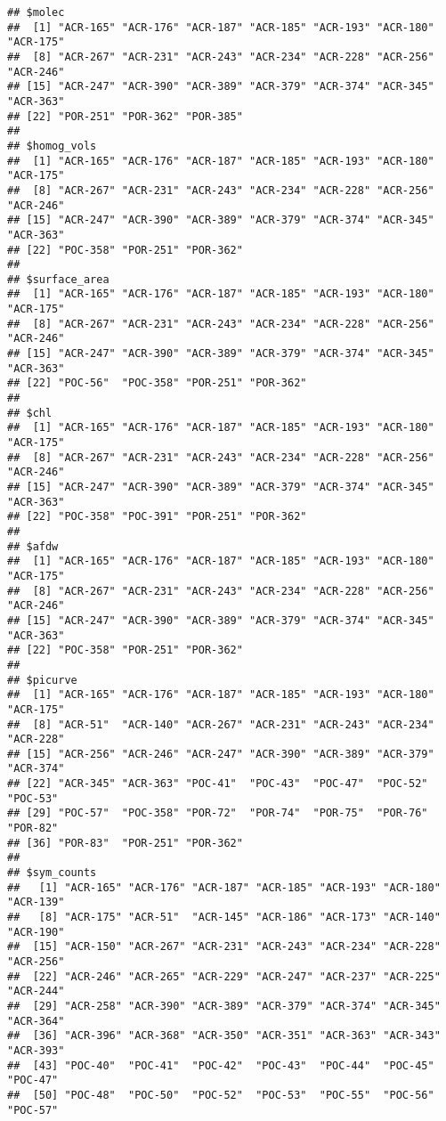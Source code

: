 \documentclass[]{article}
\begin{document}
\begin{verbatim}
## $molec
##  [1] "ACR-165" "ACR-176" "ACR-187" "ACR-185" "ACR-193" "ACR-180" "ACR-175"
##  [8] "ACR-267" "ACR-231" "ACR-243" "ACR-234" "ACR-228" "ACR-256" "ACR-246"
## [15] "ACR-247" "ACR-390" "ACR-389" "ACR-379" "ACR-374" "ACR-345" "ACR-363"
## [22] "POR-251" "POR-362" "POR-385"
## 
## $homog_vols
##  [1] "ACR-165" "ACR-176" "ACR-187" "ACR-185" "ACR-193" "ACR-180" "ACR-175"
##  [8] "ACR-267" "ACR-231" "ACR-243" "ACR-234" "ACR-228" "ACR-256" "ACR-246"
## [15] "ACR-247" "ACR-390" "ACR-389" "ACR-379" "ACR-374" "ACR-345" "ACR-363"
## [22] "POC-358" "POR-251" "POR-362"
## 
## $surface_area
##  [1] "ACR-165" "ACR-176" "ACR-187" "ACR-185" "ACR-193" "ACR-180" "ACR-175"
##  [8] "ACR-267" "ACR-231" "ACR-243" "ACR-234" "ACR-228" "ACR-256" "ACR-246"
## [15] "ACR-247" "ACR-390" "ACR-389" "ACR-379" "ACR-374" "ACR-345" "ACR-363"
## [22] "POC-56"  "POC-358" "POR-251" "POR-362"
## 
## $chl
##  [1] "ACR-165" "ACR-176" "ACR-187" "ACR-185" "ACR-193" "ACR-180" "ACR-175"
##  [8] "ACR-267" "ACR-231" "ACR-243" "ACR-234" "ACR-228" "ACR-256" "ACR-246"
## [15] "ACR-247" "ACR-390" "ACR-389" "ACR-379" "ACR-374" "ACR-345" "ACR-363"
## [22] "POC-358" "POC-391" "POR-251" "POR-362"
## 
## $afdw
##  [1] "ACR-165" "ACR-176" "ACR-187" "ACR-185" "ACR-193" "ACR-180" "ACR-175"
##  [8] "ACR-267" "ACR-231" "ACR-243" "ACR-234" "ACR-228" "ACR-256" "ACR-246"
## [15] "ACR-247" "ACR-390" "ACR-389" "ACR-379" "ACR-374" "ACR-345" "ACR-363"
## [22] "POC-358" "POR-251" "POR-362"
## 
## $picurve
##  [1] "ACR-165" "ACR-176" "ACR-187" "ACR-185" "ACR-193" "ACR-180" "ACR-175"
##  [8] "ACR-51"  "ACR-140" "ACR-267" "ACR-231" "ACR-243" "ACR-234" "ACR-228"
## [15] "ACR-256" "ACR-246" "ACR-247" "ACR-390" "ACR-389" "ACR-379" "ACR-374"
## [22] "ACR-345" "ACR-363" "POC-41"  "POC-43"  "POC-47"  "POC-52"  "POC-53" 
## [29] "POC-57"  "POC-358" "POR-72"  "POR-74"  "POR-75"  "POR-76"  "POR-82" 
## [36] "POR-83"  "POR-251" "POR-362"
## 
## $sym_counts
##   [1] "ACR-165" "ACR-176" "ACR-187" "ACR-185" "ACR-193" "ACR-180" "ACR-139"
##   [8] "ACR-175" "ACR-51"  "ACR-145" "ACR-186" "ACR-173" "ACR-140" "ACR-190"
##  [15] "ACR-150" "ACR-267" "ACR-231" "ACR-243" "ACR-234" "ACR-228" "ACR-256"
##  [22] "ACR-246" "ACR-265" "ACR-229" "ACR-247" "ACR-237" "ACR-225" "ACR-244"
##  [29] "ACR-258" "ACR-390" "ACR-389" "ACR-379" "ACR-374" "ACR-345" "ACR-364"
##  [36] "ACR-396" "ACR-368" "ACR-350" "ACR-351" "ACR-363" "ACR-343" "ACR-393"
##  [43] "POC-40"  "POC-41"  "POC-42"  "POC-43"  "POC-44"  "POC-45"  "POC-47" 
##  [50] "POC-48"  "POC-50"  "POC-52"  "POC-53"  "POC-55"  "POC-56"  "POC-57" 

\end{verbatim}
\end{document}
